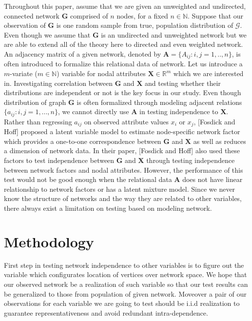 \documentclass[12pt]{article}
\theoremstyle{definition}
\begin{document}
 
 Throughout this paper, assume that we are given an unweighted and undirected, connected network $\boldsymbol{G}$ comprised of $n$ nodes, for a fixed $n \in \mathbb{N}$. Suppose that our observation of $\boldsymbol{G}$ is one random sample from true, population distribution of $\mathcal{G}$. Even though we assume that $\boldsymbol{G}$ is an undirected and unweighted network but we are able to extend all of the theory here to directed and even weighted network. An adjacency matrix of a given network, denoted by $\boldsymbol{A} = \{A_{ij} : i,j= 1,..,n \}$, is often introduced to formalize this relational data of network. Let us introduce a $m$-variate ($m \in \mathbb{N}$) variable for nodal attributes $\boldsymbol{X}  \in \mathbb{R}^{m}$ which we are interested in. Investigating correlation between $\boldsymbol{G}$ and $\boldsymbol{X}$ and testing whether their distributions are independent or not is the key focus in our study. 
 Even though distribution of graph $\boldsymbol{G}$ is often formalized through modeling adjacent relations $\{a_{ij} : i,j = 1,... , n \}$, we cannot directly use $\mathbf{A}$ in testing independence to $\mathbf{X}$. Rather than regressing $a_{ij}$ on observed attribute values $x_{i}$ or $x_{j}$, [Fosdick and Hoff] proposed a latent variable model to estimate node-specific network factor which provides a one-to-one correspondence between $\boldsymbol{G}$ and $\boldsymbol{X}$ as well as reduces a dimension of network data. In their paper, [Fosdick and Hoff] also used these factors to test independence between $\boldsymbol{G}$ and $\boldsymbol{X}$ through testing independence between network factors and nodal attributes. However, the performance of this test would not be good enough when the relational data $\boldsymbol{A}$ does not have linear relationship to network factors or has a latent mixture model. Since we never know the structure of networks and the way they are related to other variables, there always exist a limitation on testing based on modeling network.    

\newpage
\section{Methodology}

First step in testing network independence to other variables is to figure out the variable which configurates location of vertices over network space.  We hope that our observed network be a realization of such variable so that our test results can be generalized to those from population of given network. Moveover a pair of our observations for each variable we are going to test should be i.i.d realization to guarantee representativeness and avoid redundant intra-dependence.  
\end{document}
